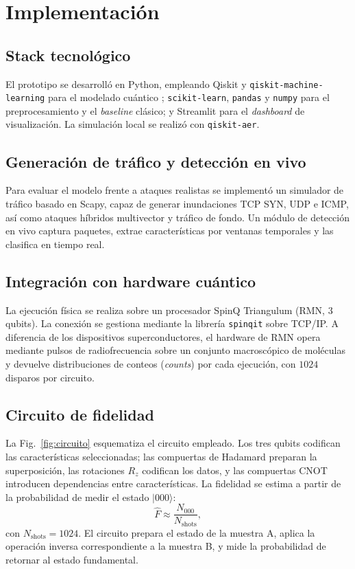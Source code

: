 \documentclass[10pt,conference]{IEEEtran}
\begin{document}
\section{Implementación}

\subsection{Stack tecnológico}
El prototipo se desarrolló en Python, empleando Qiskit y
\texttt{qiskit-machine-learning} para el modelado cuántico
\cite{qiskit2023}; \texttt{scikit-learn}, \texttt{pandas} y
\texttt{numpy} para el preprocesamiento y el \textit{baseline} clásico;
y Streamlit para el \textit{dashboard} de visualización. La simulación
local se realizó con \texttt{qiskit-aer}.

\subsection{Generación de tráfico y detección en vivo}
Para evaluar el modelo frente a ataques realistas se implementó un
simulador de tráfico basado en Scapy, capaz de generar inundaciones TCP
SYN, UDP e ICMP, así como ataques híbridos multivector y tráfico de
fondo. Un módulo de detección en vivo captura paquetes, extrae
características por ventanas temporales y las clasifica en tiempo real.

\subsection{Integración con hardware cuántico}
La ejecución física se realiza sobre un procesador SpinQ Triangulum
(RMN, 3 qubits). La conexión se gestiona mediante la librería
\texttt{spinqit} sobre TCP/IP. A diferencia de los dispositivos
superconductores, el hardware de RMN opera mediante pulsos de
radiofrecuencia sobre un conjunto macroscópico de moléculas y devuelve
distribuciones de conteos (\textit{counts}) por cada ejecución, con
$1024$ disparos por circuito.

\subsection{Circuito de fidelidad}
La Fig.~\ref{fig:circuito} esquematiza el circuito empleado. Los tres
qubits codifican las características seleccionadas; las compuertas de
Hadamard preparan la superposición, las rotaciones $R_z$ codifican los
datos, y las compuertas CNOT introducen dependencias entre
características. La fidelidad se estima a partir de la probabilidad de
medir el estado $|000\rangle$:
\begin{equation}
  \widehat{F} \approx \frac{N_{000}}{N_{\text{shots}}},
  \label{eq:fidelidad}
\end{equation}
con $N_{\text{shots}}=1024$. El circuito prepara el estado de la
muestra A, aplica la operación inversa correspondiente a la muestra B,
y mide la probabilidad de retornar al estado fundamental.
\end{document}
